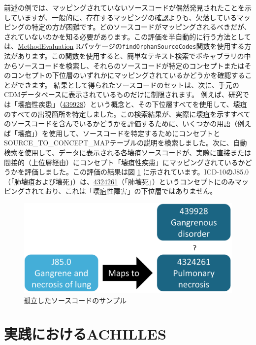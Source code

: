 \documentclass[
  11pt]{book}
\theoremstyle{definition}
\theoremstyle{definition}
\theoremstyle{definition}
\theoremstyle{definition}
\theoremstyle{remark}
\begin{document}
前述の例では、マッピングされていないソースコードが偶然発見されたことを示していますが、一般的に、存在するマッピングの確認よりも、欠落しているマッピングの特定の方が困難です。どのソースコードがマッピングされるべきだが、されていないのかを知る必要があります。この評価を半自動的に行う方法としては、\href{https://ohdsi.github.io/MethodEvaluation/}{MethodEvaluation} Rパッケージの\texttt{findOrphanSourceCodes}関数を使用する方法があります。この関数を使用すると、簡単なテキスト検索でボキャブラリの中からソースコードを検索し、それらのソースコードが特定のコンセプトまたはそのコンセプトの下位層のいずれかにマッピングされているかどうかを確認することができます。 結果として得られたソースコードのセットは、次に、手元のCDMデータベースに表示されているものだけに制限されます。 例えば、研究では「壊疽性疾患」（\href{http://athena.ohdsi.org/search-terms/terms/439928}{439928}）という概念と、その下位層すべてを使用して、壊疽のすべての出現箇所を特定しました。この検索結果が、実際に壊疽を示すすべてのソースコードを含んでいるかどうかを評価するために、いくつかの用語（例えば「壊疽」）を使用して、ソースコードを特定するためにコンセプトとSOURCE\_TO\_CONCEPT\_MAPテーブルの説明を検索しました。次に、自動検索を使用して、データに表示される各壊疽ソースコードが、実際に直接または間接的（上位層経由）にコンセプト「壊疽性疾患」にマッピングされているかどうかを評価しました。この評価の結果は図 \ref{fig:missingMapping} に示されています。ICD-10のJ85.0（「肺壊疽および壊死」）は、\href{http://athena.ohdsi.org/search-terms/terms/4324261}{4324261}（「肺壊死」）というコンセプトにのみマッピングされており、これは「壊疽性障害」の下位層ではありません。

\begin{figure}

{\centering \includegraphics[width=0.7\linewidth]{images/DataQuality/missingMapping} 

}

\caption{孤立したソースコードのサンプル}\label{fig:missingMapping}
\end{figure}

\section{実践におけるACHILLES}\label{achillesInPractice}
\end{document}
